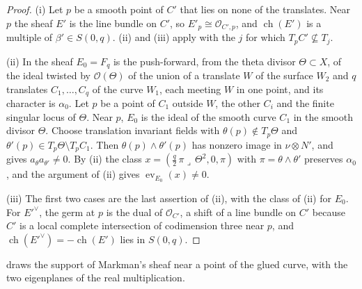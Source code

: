 \documentclass[11pt,reqno]{amsart}
\theoremstyle{plain}
\theoremstyle{definition}
\theoremstyle{remark}
\newcommand{\cO}{\mathcal{O}}
\DeclareMathOperator{\ch}{ch}
\begin{document}
\begin{proof}
(i) Let $p$ be a smooth point of $C'$ that lies on none of the translates.
Near $p$ the sheaf $E'$ is the line bundle on $C'$, so $E'_{p}\cong\cO_{C',p}$,
and $\ch(E')$ is a multiple of $\beta'\in S(0,q)$.
(ii) and (iii) apply with the $j$ for which
$T_{p}C'\not\subseteq T_{j}$.

(ii) In \cite[Example~8.2.4]{Mar25a} the sheaf $E_{0}=F_{q}$ is the
push-forward, from the theta divisor $\Theta\subset X$, of the ideal twisted
by $\cO(\Theta)$ of the union of a translate $W$ of the surface $W_{2}$ and
$q$ translates $C_{1},\dots,C_{q}$ of the curve $W_{1}$, each meeting $W$ in
one point, and its character is $\alpha_{0}$. Let $p$ be a point of $C_{1}$ outside $W$, the other $C_{i}$
and the finite singular locus of $\Theta$. Near $p$, $E_{0}$ is the ideal of
the smooth curve $C_{1}$ in the smooth divisor $\Theta$. Choose translation
invariant fields with $\theta(p)\notin T_{p}\Theta$ and
$\theta'(p)\in T_{p}\Theta\setminus T_{p}C_{1}$. Then
$\theta(p)\wedge\theta'(p)$ has nonzero image in $\nu\otimes N'$, and
 gives $a_{\theta}a_{\theta'}\ne0$. By
(ii) the class
$x=(\frac q2\,\pi\lrcorner\,\Theta^{2},0,\pi)$ with $\pi=\theta\wedge\theta'$
preserves $\alpha_{0}$, and the argument of (ii) gives
$\operatorname{ev}_{E_{0}}(x)\ne0$.

(iii) The first two cases are the last assertion of
(ii), with the class of (ii) for $E_{0}$. For
$E'^{\vee}$, the germ at $p$ is the dual of $\cO_{C'}$, a shift of a line
bundle on $C'$ because $C'$ is a local complete intersection of codimension
three near $p$, and $\ch(E'^{\vee})=-\ch(E')$ lies in $S(0,q)$.
\end{proof}

 draws the support of Markman's sheaf near a point
of the glued curve, with the two eigenplanes of the real multiplication.
\end{document}
